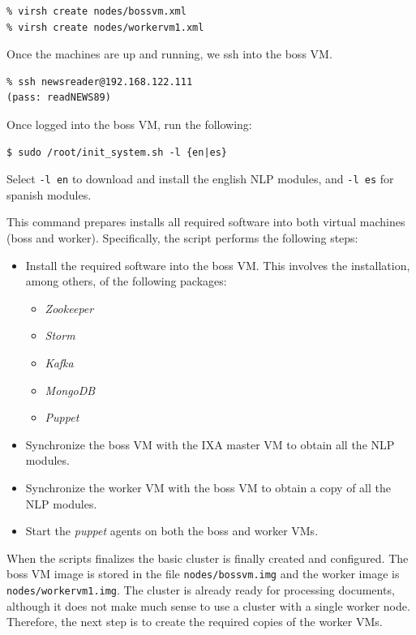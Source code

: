 \documentclass[a4]{article}
\begin{document}
\begin{verbatim}
% virsh create nodes/bossvm.xml
% virsh create nodes/workervm1.xml
\end{verbatim}

Once the machines are up and running, we ssh into the boss VM.

\begin{verbatim}
% ssh newsreader@192.168.122.111
(pass: readNEWS89)
\end{verbatim}

Once logged into the boss VM, run the following:

\begin{verbatim}
$ sudo /root/init_system.sh -l {en|es}
\end{verbatim}

Select \texttt{-l en} to download and install the english NLP modules, and \texttt{-l es} for spanish modules.

This command prepares installs all required software into both virtual
machines (boss and worker). Specifically, the script performs the following steps:
\begin{itemize}
\item Install the required software into the boss VM. This involves the
  installation, among others, of the following packages:
  \begin{itemize}
  \item \emph{Zookeeper}
  \item \emph{Storm}
  \item \emph{Kafka}
  \item \emph{MongoDB}
  \item \emph{Puppet}
  \end{itemize}
\item Synchronize the boss VM with the IXA master VM to obtain all the NLP
  modules.
\item Synchronize the worker VM with the boss VM to obtain a copy of all the
  NLP modules.
\item Start the \emph{puppet} agents on both the boss and worker VMs.
\end{itemize}

When the scripts finalizes the basic cluster is finally created and
configured. The boss VM image is stored in the file
\texttt{nodes/bossvm.img} and the worker image is
\texttt{nodes/workervm1.img}. The cluster is already ready for processing
documents, although it does not make much sense to use a cluster with a
single worker node. Therefore, the next step is to create the required
copies of the worker VMs.
\end{document}
